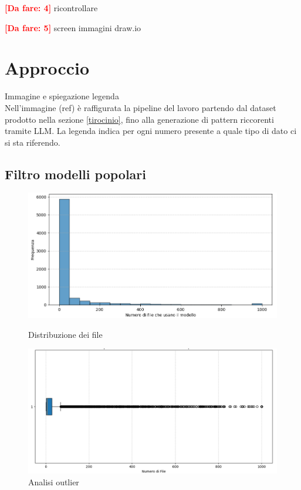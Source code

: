 \documentclass{article}
\newcommand{\dafare}[1]{\textbf{\textcolor{red}{[Da fare: #1]}}}
\begin{document}
\dafare{4}
ricontrollare

\dafare{5}
screen immagini draw.io

\section{Approccio}
Immagine e spiegazione legenda\\
Nell'immagine (ref) è raffigurata la pipeline del lavoro partendo dal dataset prodotto nella sezione \ref{tirocinio}, fino alla generazione di pattern riccorenti tramite LLM. La legenda indica per ogni numero presente a quale tipo di dato ci si sta riferendo.\\
\subsection{Filtro modelli popolari}
\begin{figure}[h]
    \centering
    \begin{minipage}{0.45\textwidth}
        \centering
        \includegraphics[width=\linewidth]{images/approccio1.png}
        \caption{Distribuzione dei file}
        \label{fig:distribuzione_file1}
    \end{minipage}
    \hfill
    \begin{minipage}{0.45\textwidth}
        \centering
        \includegraphics[width=\linewidth]{images/approccio2.png}
        \caption{Analisi outlier}
        \label{fig:outlier_file1}
    \end{minipage}
\end{figure}
\end{document}
